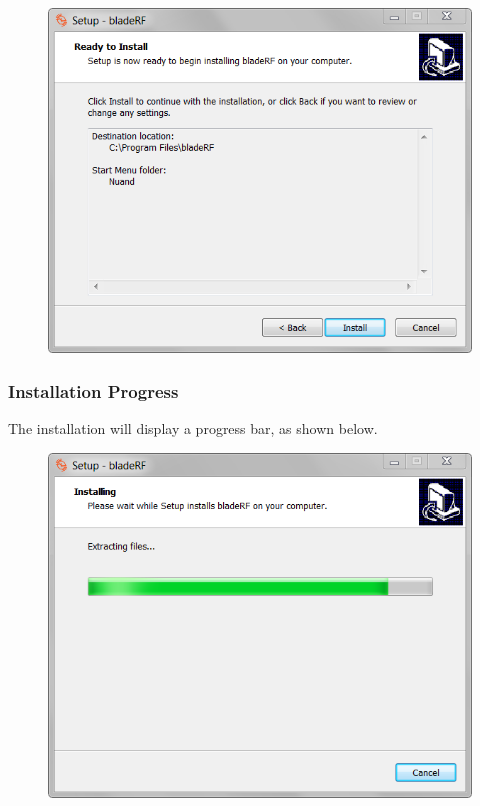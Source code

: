 {\begin{figure}[h]
  \centering
  \includegraphics{images/windows/installer/07-ready.png}
\end{figure}


\newpage
\subsubsection{Installation Progress}

The installation will display a progress bar, as shown below.

\begin{figure}[h]
  \centering
  \includegraphics{images/windows/installer/08-installing.png}
\end{figure}

}

